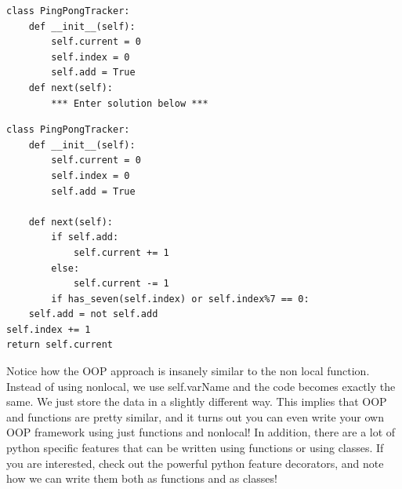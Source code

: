 \documentclass{exam}
\begin{document}
\begin{questions}
\begin{blocksection}
\begin{lstlisting}
class PingPongTracker:
    def __init__(self):
        self.current = 0
        self.index = 0
        self.add = True
    def next(self):
        *** Enter solution below ***
\end{lstlisting}
\end{blocksection}

\begin{blocksection}
\begin{solution}[0.3in]
\begin{lstlisting}
class PingPongTracker:
    def __init__(self):
        self.current = 0
        self.index = 0
        self.add = True
    
    def next(self):
        if self.add:
            self.current += 1
        else:
            self.current -= 1
        if has_seven(self.index) or self.index%7 == 0:
    self.add = not self.add
self.index += 1
return self.current
\end{lstlisting}
Notice how the OOP approach is insanely similar to the non local function. Instead of using nonlocal, we use self.varName and the code becomes exactly the same. We just store the data in a slightly different way. This implies that OOP and functions are pretty similar, and it turns out you can even write your own OOP framework using just functions and nonlocal!  \newline
\newline
In addition, there are a lot of python specific features that can be written using functions or using classes. If you are interested, check out the powerful python feature decorators, and note how we can write them both as functions and as classes!
\end{solution}

\end{blocksection}

\end{questions}

\end{document}
